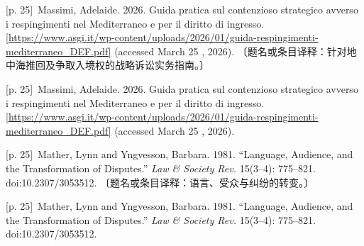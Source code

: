 \documentclass[10pt,a4paper]{article}
\begin{document}
\noindent\begin{minipage}{\textwidth}\begin{minipage}[t]{\dimexpr.5\textwidth-4mm\relax}{\scriptsize\color{gray} [p. 25]}\ Massimi, Adelaide. 2026. Guida pratica sul contenzioso strategico avverso i respingimenti nel Mediterraneo e per il diritto di ingresso. [\url{https://www.asgi.it/wp-content/uploads/2026/01/guida-respingimenti-mediterraneo_DEF.pdf]} (accessed March 25 , 2026). 〔题名或条目译释：针对地中海推回及争取入境权的战略诉讼实务指南。〕\par\end{minipage}\hfill\begin{minipage}[t]{\dimexpr.5\textwidth-4mm\relax}{\scriptsize\color{gray} [p. 25]}\ Massimi, Adelaide. 2026. Guida pratica sul contenzioso strategico avverso i respingimenti nel Mediterraneo e per il diritto di ingresso. [\url{https://www.asgi.it/wp-content/uploads/2026/01/guida-respingimenti-mediterraneo_DEF.pdf]} (accessed March 25 , 2026).\par\end{minipage}\end{minipage}\par
\noindent\begin{minipage}{\textwidth}\begin{minipage}[t]{\dimexpr.5\textwidth-4mm\relax}{\scriptsize\color{gray} [p. 25]}\ Mather, Lynn and Yngvesson, Barbara. 1981. “Language, Audience, and the Transformation of Disputes.” \textit{Law \& Society Rev.} 15(3–4): 775–821. doi:10.2307/3053512. 〔题名或条目译释：语言、受众与纠纷的转变。〕\par\end{minipage}\hfill\begin{minipage}[t]{\dimexpr.5\textwidth-4mm\relax}{\scriptsize\color{gray} [p. 25]}\ Mather, Lynn and Yngvesson, Barbara. 1981. “Language, Audience, and the Transformation of Disputes.” \textit{Law \& Society Rev.} 15(3–4): 775–821. doi:10.2307/3053512.\par\end{minipage}\end{minipage}\par
\end{document}
